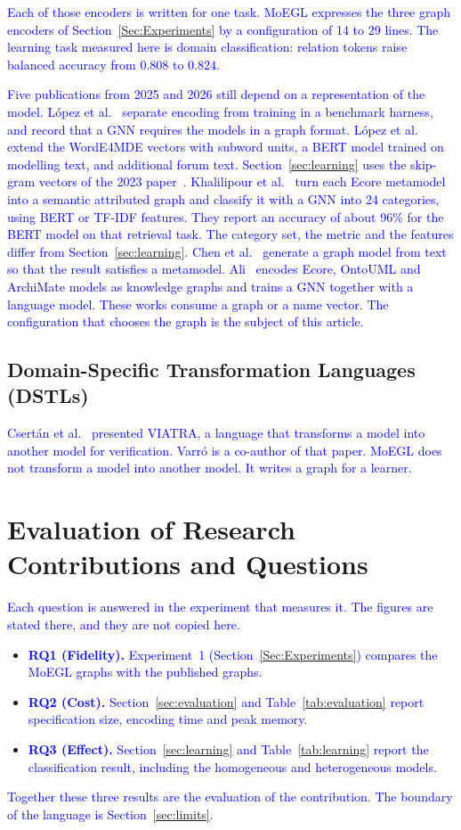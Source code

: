 \documentclass[journal,article,submit,moreauthors,technologies]{Definitions/mdpi}
\newcommand{\rev}[1]{\textcolor{blue}{#1}}
\begin{document}
\rev{Each of those encoders is written for one task. MoEGL expresses the three graph encoders of Section~\ref{Sec:Experiments} by a configuration of 14 to 29 lines. The learning task measured here is domain classification: relation tokens raise balanced accuracy from $0.808$ to $0.824$.}

\rev{Five publications from 2025 and 2026 still depend on a representation of the model. L\'opez et al.~\cite{lopez2025modelxglue} separate encoding from training in a benchmark harness, and record that a GNN requires the models in a graph format. L\'opez et al.~\cite{lopez2025worde} extend the WordE4MDE vectors with subword units, a BERT model trained on modelling text, and additional forum text. Section~\ref{sec:learning} uses the skip-gram vectors of the 2023 paper~\cite{lopez2023word}. Khalilipour et al.~\cite{khalilipour2025retrieval} turn each Ecore metamodel into a semantic attributed graph and classify it with a GNN into 24 categories, using BERT or TF-IDF features. They report an accuracy of about 96\% for the BERT model on that retrieval task. The category set, the metric and the features differ from Section~\ref{sec:learning}. Chen et al.~\cite{chen2025graphgen} generate a graph model from text so that the result satisfies a metamodel. Ali~\cite{ali2026symbols} encodes Ecore, OntoUML and ArchiMate models as knowledge graphs and trains a GNN together with a language model. These works consume a graph or a name vector. The configuration that chooses the graph is the subject of this article.}

\subsection{Domain-Specific Transformation Languages (DSTLs)}
\rev{Csert\'an et al.~\cite{csertan2002viatra} presented VIATRA, a language that transforms a model into another model for verification. Varr\'o is a co-author of that paper. MoEGL does not transform a model into another model. It writes a graph for a learner.}


\section{Evaluation of Research Contributions and Questions}
\rev{Each question is answered in the experiment that measures it. The figures are stated there, and they are not copied here.}
\begin{itemize}
    \item \rev{\textbf{RQ1 (Fidelity).} Experiment~1 (Section~\ref{Sec:Experiments}) compares the MoEGL graphs with the published graphs.}
    \item \rev{\textbf{RQ2 (Cost).} Section~\ref{sec:evaluation} and Table~\ref{tab:evaluation} report specification size, encoding time and peak memory.}
    \item \rev{\textbf{RQ3 (Effect).} Section~\ref{sec:learning} and Table~\ref{tab:learning} report the classification result, including the homogeneous and heterogeneous models.}
\end{itemize}
\rev{Together these three results are the evaluation of the contribution. The boundary of the language is Section~\ref{sec:limits}.}
\end{document}
